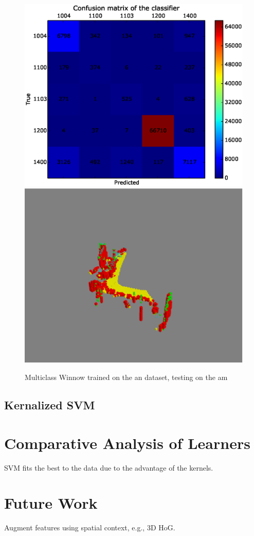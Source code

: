 \documentclass[10pt,a4paper]{article}
\begin{document}
\begin{figure}[htp]
\includegraphics[scale=0.4,trim = 0.3 0.3 0.3 0.3,clip]{figs/winnow_antoam_test1.eps}
\includegraphics[scale=0.4]{figs/winnow_antoam_test1_plot.eps}
\caption{Multiclass Winnow trained on the an dataset, testing on the am}
\label{}
\end{figure}
\subsection{Kernalized SVM}


\section{Comparative Analysis of Learners}
SVM fits the best to the data due to the advantage of the kernels.

\section{Future Work}
Augment features using spatial context, e.g., 3D HoG.\\
\end{document}
